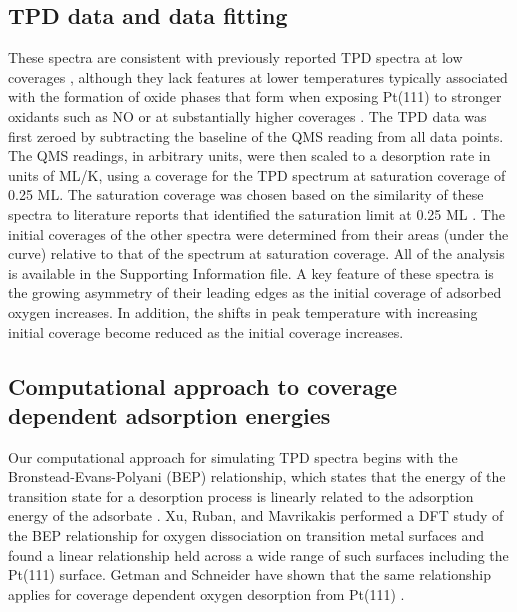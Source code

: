 \documentclass{svjour3}
\begin{document}
\subsection{TPD data and data fitting}
\label{sec:org72b0728}
These spectra are consistent with previously reported TPD spectra at low coverages \cite{allers1996,zhdanov1998}, although they lack features at lower temperatures typically associated with the formation of oxide phases that form when exposing Pt(111) to stronger oxidants such as NO \cite{mudiyanselage2009} or at substantially higher coverages \cite{Parker1989489}. The TPD data was first zeroed by subtracting the baseline of the QMS reading from all data points.  The QMS readings, in arbitrary units, were then scaled to a desorption rate in units of ML/K, using a coverage for the TPD spectrum at saturation coverage of 0.25 ML. The saturation coverage was chosen based on the similarity of these spectra to literature reports that identified the saturation limit at 0.25 ML \cite{allers1996,zhdanov1998}. The initial coverages of the other spectra were determined from their areas (under the curve) relative to that of the spectrum at saturation coverage. All of the analysis is available in the Supporting Information file.   A key feature of these spectra is the growing asymmetry of their leading edges as the initial coverage of adsorbed oxygen increases.  In addition, the shifts in peak temperature with increasing initial coverage become reduced as the initial coverage increases.

\subsection{Computational approach to coverage dependent adsorption energies}
\label{sec:orgeb17f9b}
Our computational approach for simulating TPD spectra begins with the Bronstead-Evans-Polyani (BEP) relationship, which states that the energy of the transition state for a desorption process is linearly related to the adsorption energy of the adsorbate \cite{barteau1991,bligaard2004,xu2004}.   Xu, Ruban, and Mavrikakis performed a DFT study of the BEP relationship for oxygen dissociation on transition metal surfaces and found a linear relationship held across a wide range of such surfaces \cite{xu2004} including the Pt(111) surface. Getman and Schneider have shown that the same relationship applies for coverage dependent oxygen desorption from Pt(111) \cite{getman2010}. 
\end{document}
